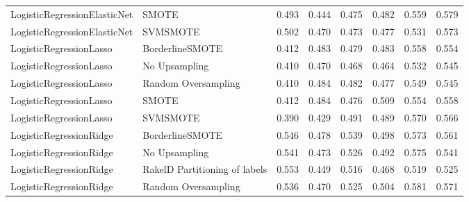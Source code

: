 \begin{tabular}{llllllll}
   LogisticRegressionElasticNet &                         SMOTE & 0.493 &                     0.444 &                 0.475 &                  0.482 &                                   0.559 &     0.579 \\
   LogisticRegressionElasticNet &                      SVMSMOTE & 0.502 &                     0.470 &                 0.473 &                  0.477 &                                   0.531 &     0.573 \\
        LogisticRegressionLasso &               BorderlineSMOTE & 0.412 &                     0.483 &                 0.479 &                  0.483 &                                   0.558 &     0.554 \\
        LogisticRegressionLasso &                 No Upsampling & 0.410 &                     0.470 &                 0.468 &                  0.464 &                                   0.532 &     0.545 \\
        LogisticRegressionLasso &           Random Oversampling & 0.410 &                     0.484 &                 0.482 &                  0.477 &                                   0.549 &     0.545 \\
        LogisticRegressionLasso &                         SMOTE & 0.412 &                     0.484 &                 0.476 &                  0.509 &                                   0.554 &     0.558 \\
        LogisticRegressionLasso &                      SVMSMOTE & 0.390 &                     0.429 &                 0.491 &                  0.489 &                                   0.570 &     0.566 \\
        LogisticRegressionRidge &               BorderlineSMOTE & 0.546 &                     0.478 &                 0.539 &                  0.498 &                                   0.573 &     0.561 \\
        LogisticRegressionRidge &                 No Upsampling & 0.541 &                     0.473 &                 0.526 &                  0.492 &                                   0.575 &     0.541 \\
        LogisticRegressionRidge & RakelD Partitioning of labels & 0.553 &                     0.449 &                 0.516 &                  0.468 &                                   0.519 &     0.525 \\
        LogisticRegressionRidge &           Random Oversampling & 0.536 &                     0.470 &                 0.525 &                  0.504 &                                   0.581 &     0.571 \\

\end{tabular}
